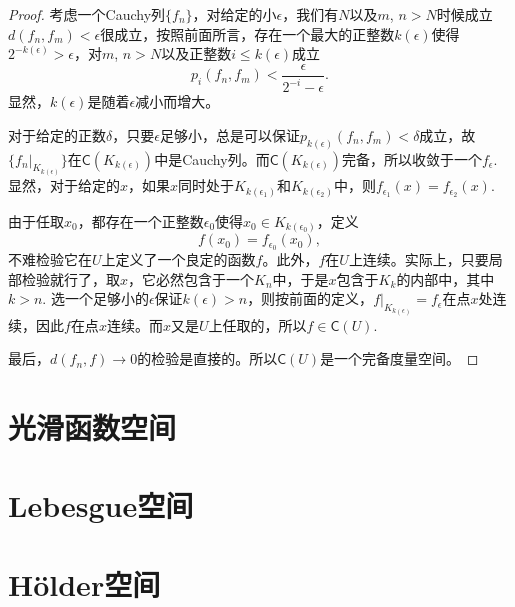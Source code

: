 \begin{proof}
考虑一个Cauchy列$\{f_n\}$，对给定的小$\epsilon$，我们有$N$以及$m$, $n>N$时候成立$d(f_n,f_m)<\epsilon$很成立，按照前面所言，存在一个最大的正整数$k(\epsilon)$使得$2^{-k(\epsilon)}>\epsilon$，对$m$, $n>N$以及正整数$i\leq k(\epsilon)$成立
\[
	p_i(f_n,f_m)<\frac{\epsilon}{2^{-i}-\epsilon}.
\]
显然，$k(\epsilon)$是随着$\epsilon$减小而增大。

对于给定的正数$\delta$，只要$\epsilon$足够小，总是可以保证$p_{k(\epsilon)}(f_n,f_m)<\delta$成立，故$\{f_n|_{K_{k(\epsilon)}}\}$在$\mathsf{C}(K_{k(\epsilon)})$中是Cauchy列。而$\mathsf{C}(K_{k(\epsilon)})$完备，所以收敛于一个$f_\epsilon$. 显然，对于给定的$x$，如果$x$同时处于$K_{k(\epsilon_1)}$和$K_{k(\epsilon_2)}$中，则$f_{\epsilon_1}(x)=f_{\epsilon_2}(x)$.

由于任取$x_0$，都存在一个正整数$\epsilon_0$使得$x_0\in K_{k(\epsilon_0)}$，定义
\[
	f(x_0)=f_{\epsilon_0}(x_0),
\]
不难检验它在$U$上定义了一个良定的函数$f$。此外，$f$在$U$上连续。实际上，只要局部检验就行了，取$x$，它必然包含于一个$K_n$中，于是$x$包含于$K_{k}$的内部中，其中$k>n$. 选一个足够小的$\epsilon$保证$k(\epsilon)>n$，则按前面的定义，$f|_{K_{k(\epsilon)}}=f_{\epsilon}$在点$x$处连续，因此$f$在点$x$连续。而$x$又是$U$上任取的，所以$f\in \mathsf{C} (U)$.

最后，$d(f_n,f)\to 0$的检验是直接的。所以$\mathsf{C}(U)$是一个完备度量空间。
\end{proof}

\section{光滑函数空间}

\section{Lebesgue空间}

\section{H\"{o}lder空间}
